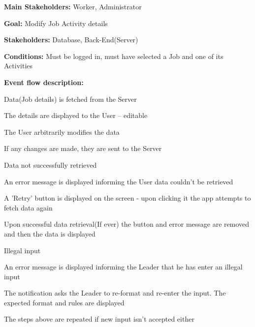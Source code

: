 			\noindent {}
			\begin{packed_item}
				\item \textbf{Main Stakeholders:} Worker, Administrator
				\item \textbf{Goal:} Modify Job Activity details
				\item \textbf{Stakeholders: } Database, Back-End(Server)
				\item \textbf{Conditions: } Must be logged in, must have selected a Job and one of its Activities
				\item \textbf{Event flow description: }
				\begin{packed_enum}
					\item Data(Job details) is fetched from the Server
					\item The details are displayed to the User -- editable
					\item The User arbitrarily modifies the data
					\item If any changes are made, they are sent to the Server
				\end{packed_enum}
				
				\begin{packed_item}
					\item[1.a] Data not successfully retrieved
					\item[] \begin{packed_enum}
						\item An error message is displayed informing the User data couldn't be retrieved
						\item A 'Retry' button is displayed on the screen - upon clicking it the app attempts to fetch data again
						\item Upon successful data retrieval(If ever) the button and error message are removed and then the data is displayed
					\end{packed_enum}
					
					\item[3.a] Illegal input
					\item[] \begin{packed_enum}
						\item An error message is displayed informing the Leader that he has enter an illegal input
						\item The notification asks the Leader to re-format and re-enter the input. The expected format and rules are displayed
						\item The steps above are repeated if new input isn't accepted either
					\end{packed_enum}
					

\end{packed_item}
\end{packed_item}
